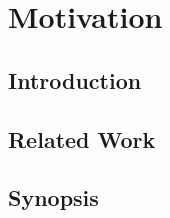 \chapter{Motivation}
\section{Introduction}








\section{Related Work}








\section{Synopsis}

